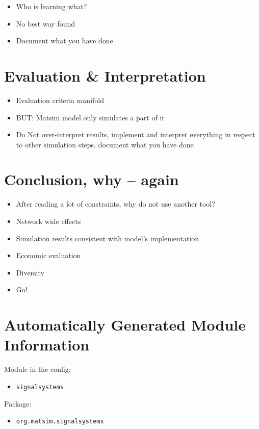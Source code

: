 \begin{itemize}
	\item Who is learning what? 
	\item No best way found
	\item Document what you have done
\end{itemize}

\section{Evaluation \& Interpretation}
\label{sec:signals_evaluation}

\begin{itemize}
	\item Evaluation criteria manifold
	\item BUT: Matsim model only simulates a part of it
	\item Do Not over-interpret results, implement and interpret everything in respect to other simulation steps, document what you have done
\end{itemize}

\section{Conclusion, why -- again}
\label{sec:signals_conclusion}

\begin{itemize}
	\item After reading a lot of constraints, why do not use another tool?
	\item Network wide effects
	\item Simulation results consistent with model's implementation 
	\item Economic evaluation
	\item Diversity 
	\item Go!
\end{itemize}

\section{Automatically Generated Module Information}
Module in the config: 
\begin{itemize}
	\item \lstinline|signalsystems|
\end{itemize}

Package:
\begin{itemize}
	\item \lstinline|org.matsim.signalsystems|
\end{itemize}

